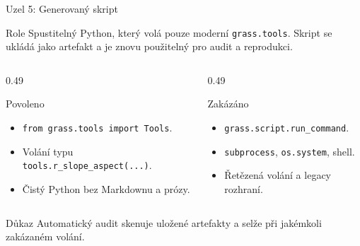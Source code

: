 \documentclass[aspectratio=169,10pt]{beamer}
\begin{document}
\begin{frame}[t]{Uzel 5: Generovaný skript}
  \small
  \begin{block}{Role}
    Spustitelný Python, který volá pouze moderní \texttt{grass.tools}. Skript
    se ukládá jako artefakt a je znovu použitelný pro audit a reprodukci.
  \end{block}

  \begin{columns}[T,onlytextwidth]
    \begin{column}{0.49\textwidth}
      \begin{block}{Povoleno}
        \begin{itemize}
          \item \texttt{from grass.tools import Tools}.
          \item Volání typu \texttt{tools.r\_slope\_aspect(...)}.
          \item Čistý Python bez Markdownu a prózy.
        \end{itemize}
      \end{block}
    \end{column}
    \begin{column}{0.49\textwidth}
      \begin{block}{Zakázáno}
        \begin{itemize}
          \item \texttt{grass.script.run\_command}.
          \item \texttt{subprocess}, \texttt{os.system}, shell.
          \item Řetězená volání a legacy rozhraní.
        \end{itemize}
      \end{block}
    \end{column}
  \end{columns}

  \begin{alertblock}{Důkaz}
    Automatický audit skenuje uložené artefakty a selže při jakémkoli zakázaném volání.
  \end{alertblock}
\end{frame}
\end{document}
